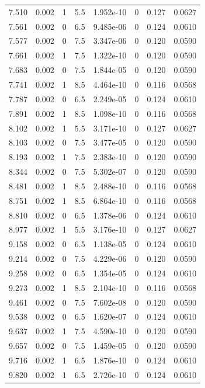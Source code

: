 \documentclass[preview]{standalone}
\begin{document}
{{{\begin{tabular}{L{1.2cm}C{1.2cm} C{0.3cm}C{0.5cm} C{1.4cm}C{1.4cm} C{1.4cm}C{1.4cm}}
  7.510  &  0.002  & 1     & 5.5 &  1.952e-10  & 0  & 0.127 &  0.0627   \\ 
  7.561  &  0.002  & 0     & 6.5 &  9.485e-06  & 0  & 0.124 &  0.0610   \\ 
  7.577  &  0.002  & 0     & 7.5 &  3.347e-06  & 0  & 0.120 &  0.0590   \\ 
  7.661  &  0.002  & 1     & 7.5 &  1.322e-10  & 0  & 0.120 &  0.0590   \\ 
  7.683  &  0.002  & 0     & 7.5 &  1.844e-05  & 0  & 0.120 &  0.0590   \\ 
  7.741  &  0.002  & 1     & 8.5 &  4.464e-10  & 0  & 0.116 &  0.0568   \\ 
  7.787  &  0.002  & 0     & 6.5 &  2.249e-05  & 0  & 0.124 &  0.0610   \\ 
  7.891  &  0.002  & 1     & 8.5 &  1.098e-10  & 0  & 0.116 &  0.0568   \\ 
  8.102  &  0.002  & 1     & 5.5 &  3.171e-10  & 0  & 0.127 &  0.0627   \\ 
  8.103  &  0.002  & 0     & 7.5 &  3.477e-05  & 0  & 0.120 &  0.0590   \\ 
  8.193  &  0.002  & 1     & 7.5 &  2.383e-10  & 0  & 0.120 &  0.0590   \\ 
  8.344  &  0.002  & 0     & 7.5 &  5.302e-07  & 0  & 0.120 &  0.0590   \\ 
  8.481  &  0.002  & 1     & 8.5 &  2.488e-10  & 0  & 0.116 &  0.0568   \\ 
  8.751  &  0.002  & 1     & 8.5 &  6.864e-10  & 0  & 0.116 &  0.0568   \\ 
  8.810  &  0.002  & 0     & 6.5 &  1.378e-06  & 0  & 0.124 &  0.0610   \\ 
  8.977  &  0.002  & 1     & 5.5 &  3.176e-10  & 0  & 0.127 &  0.0627   \\ 
  9.158  &  0.002  & 0     & 6.5 &  1.138e-05  & 0  & 0.124 &  0.0610   \\ 
  9.214  &  0.002  & 0     & 7.5 &  4.229e-06  & 0  & 0.120 &  0.0590   \\ 
  9.258  &  0.002  & 0     & 6.5 &  1.354e-05  & 0  & 0.124 &  0.0610   \\ 
  9.273  &  0.002  & 1     & 8.5 &  2.104e-10  & 0  & 0.116 &  0.0568   \\ 
  9.461  &  0.002  & 0     & 7.5 &  7.602e-08  & 0  & 0.120 &  0.0590   \\ 
  9.538  &  0.002  & 0     & 6.5 &  1.620e-07  & 0  & 0.124 &  0.0610   \\ 
  9.637  &  0.002  & 1     & 7.5 &  4.590e-10  & 0  & 0.120 &  0.0590   \\ 
  9.657  &  0.002  & 0     & 7.5 &  1.459e-05  & 0  & 0.120 &  0.0590   \\ 
  9.716  &  0.002  & 1     & 6.5 &  1.876e-10  & 0  & 0.124 &  0.0610   \\ 
  9.820  &  0.002  & 1     & 6.5 &  2.726e-10  & 0  & 0.124 &  0.0610   \\ 
\hline 
\end{tabular} 

}}}
\end{document}
